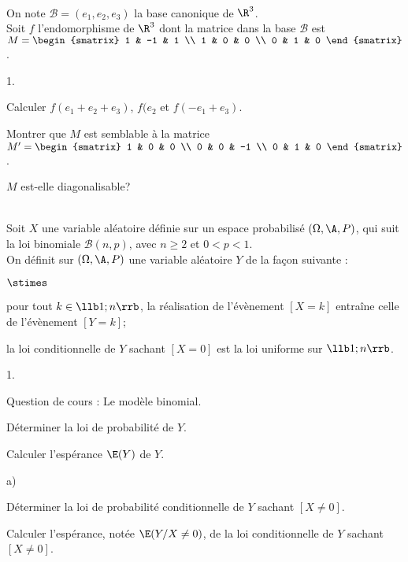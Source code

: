 \documentclass[11pt]{article}%
\begin{document}
\begin{exerciceSP}~\\
  On note $\mathcal{B} = (e_1 , e_2 , e_3)$ la base canonique de $\R^3$. \\
  Soit $f$ l'endomorphisme de $\R^3$ dont la matrice dans la base
  $\mathcal{B}$ est $M = 
  \begin{smatrix} 
    1 & -1 & 1 \\
    1 & 0 & 0 \\
    0 & 1 & 0 
  \end{smatrix}$. 
  \begin{noliste}{1.}
    \setlength{\itemsep}{2mm}
  \item Calculer $f(e_1 + e_2 + e_3)$, $f(e_2$ et $f(-e_1 + e_3)$.
  \item Montrer que $M$ est semblable à la matrice $M'
    = \begin{smatrix} 
      1 & 0 & 0 \\ 
      0 & 0 & -1 \\ 
      0 & 1 & 0
    \end{smatrix}$.
  \item $M$ est-elle diagonalisable?
  \end{noliste}
\end{exerciceSP}


\newpage


\begin{exerciceAP}~\\
  Soit $X$ une variable aléatoire définie sur un espace probabilisé
  $(\Omega , \A , P)$, qui suit la loi binomiale $\mathcal{B} (n ,
  p)$, avec $n \geq 2$ et $0 < p < 1$.
  \\[.2cm]
  On définit sur $(\Omega , \A , P)$ une variable aléatoire $Y$ de la
  façon suivante :
  \begin{noliste}{$\stimes$}
  \item pour tout $k \in \llb 1 ; n \rrb$, la réalisation de
    l'évènement $[X=k]$ entraîne celle de l'évènement $[Y=k]$;
  \item la loi conditionnelle de $Y$ sachant $[X=0]$ est la loi
    uniforme sur $\llb 1 ; n \rrb$.
  \end{noliste}
  \begin{noliste}{1.}
    \setlength{\itemsep}{2mm}
  \item Question de cours : Le modèle binomial. 
  \item Déterminer la loi de probabilité de $Y$.
  \item Calculer l'espérance $\E(Y)$ de $Y$.
  \item 
    \begin{noliste}{a)}
    \setlength{\itemsep}{2mm} \item Déterminer la loi de probabilité
      conditionnelle de $Y$ sachant $[X \neq 0]$.
    \item Calculer l'espérance, notée $\E(Y \slash X \neq 0)$, de la
      loi conditionnelle de $Y$ sachant $[X \neq 0]$.
    \end{noliste}
  \end{noliste}
\end{exerciceAP}
\end{document}
